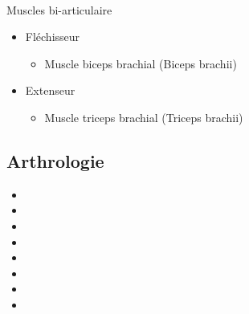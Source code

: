 \documentclass[pdftex,a4paper,11pt]{report}
\numberwithin{equation}{subsection}
\begin{document}
\paragraph{}
Muscles bi-articulaire
\begin{itemize}
    \item Fléchisseur
    \begin{itemize}
        \item Muscle biceps brachial (Biceps brachii)
    \end{itemize}
    \item Extenseur
    \begin{itemize}
        \item Muscle triceps brachial (Triceps brachii)
    \end{itemize}
\end{itemize}

\subsection{Arthrologie}

\begin{itemize}
    \item 
    \item 
    \item 
    \item 
    \item 
    \item 
    \item 
    \item 
\end{itemize}







\end{document}
